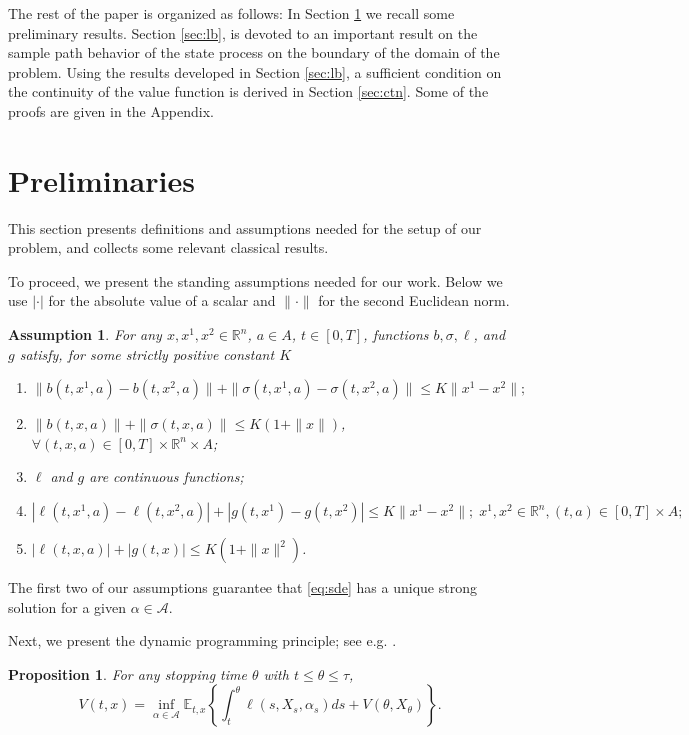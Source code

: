 \documentclass[11pt,reqno]{amsart}
\numberwithin{equation}{section}
\newtheorem{prop}{Proposition}[section]
\newtheorem{asm}{Assumption}[section]
\newcommand{\R}{\mathbb{R}}
\begin{document}
The rest of the paper is organized as
follows: In Section 
 \ref{sec:prelim} we recall some preliminary results.  Section \ref{sec:lb}, is
devoted to an important result on the sample path behavior of the state process on the boundary of the domain of the problem. Using the results developed in Section  \ref{sec:lb},
a sufficient condition on the continuity of the value function is derived in Section
\ref{sec:ctn}. Some of the proofs are given in the Appendix.

\section{Preliminaries} \label{sec:prelim}
This section presents definitions and assumptions needed for the setup
of our problem, and collects some relevant classical results.

To proceed, we present the standing assumptions needed for our work. Below we use $|\cdot|$ for the absolute value of a scalar and
$\|\cdot\|$ for the second Euclidean norm.
\begin{asm}
  \label{a-sde} For any $x, x^1, x^2 \in \R^n$, $a \in A$, $t \in
  [0,T]$, functions  $b, \sigma, \ell$, and $g$ satisfy, for some  strictly
  positive constant $K$
\begin{enumerate}
\item
 $   \|b(t,x^1,a) - b(t,x^2,a)\| + \|\sigma(t,x^1,a) - \sigma(t,x^2,a)\|  
   \le K {\|x^1 - x^2\|};$
\item $\|b(t,x,a)\| + \|\sigma(t,x,a)\| \le
  K(1 + \|x\|)$, $\forall (t,x,a) \in [0,T]\times \mathbb{R}^n \times A$;
\item $\ell$ and $g$ are continuous functions;
\item %
 $    |\ell(t,x^1,a) - \ell(t,x^2,a)|  +|g(t,x^1) - g(t,x^2)|
   \le K {\|x^1 - x^2\|}; \; x^1, x^2 \in \R^n, (t,a) \in [0,T] \times A;$
\item $|\ell(t,x,a)| + |g(t,x)| \le K(1 + \|x\|^2 )$.\end{enumerate}
\end{asm}
The first two of our assumptions guarantee that \eqref{eq:sde} has a unique strong solution for a given $\alpha \in \mathcal{A}$.


Next, we present the dynamic programming principle; see e.g. \cite{FS06, MY99}.
\begin{prop}\label{p-dpp}
  For any stopping time $\theta$ with $t\le \theta \le \tau$, 
  \begin{equation}
    \label{eq:dpp}
    V(t,x) = \inf_{\alpha \in \mathcal{A}} \mathbb{E}_{t,x}\left\{\int_t^{\theta}
    \ell(s, X_s, \alpha_s) ds + V(\theta,
    X_{\theta})\right\}.  
  \end{equation}
  \end{prop}
\end{document}

